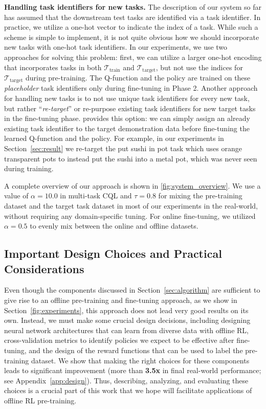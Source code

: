 \textbf{Handling task identifiers for new tasks.} The description of our system so far has assumed that the downstream test tasks are identified via a task identifier. In practice, we utilize a one-hot vector to indicate the index of a task. While such a scheme is simple to implement, it is not quite obvious how we should incorporate new tasks with one-hot task identifiers. In our experiments, we use two approaches for solving this problem: first, we can utilize a larger one-hot encoding that incorporates tasks in both $\mathcal{T}_\text{train}$ and $\mathcal{T}_\text{target}$, but not use the indices for $\mathcal{T}_\text{target}$ during pre-training. The Q-function and the policy are trained on these \emph{placeholder} task identifiers only during fine-tuning in Phase 2. 
Another approach for handling new tasks is to not use unique task identifiers for every new task, but rather ``\emph{re-target}'' or re-purpose existing task identifiers for new target tasks in the fine-tuning phase. \ptrmethodname provides this option: we can simply assign an already existing task identifier to the target demonstration data before fine-tuning the learned Q-function and the policy. For example, in our experiments in Section~\ref{sec:result} we re-target the put sushi in pot task which uses orange transparent pots to instead put the sushi into a metal pot, which was never seen during training.

A complete overview of our approach is shown in \autoref{fig:system_overview}. We use a value of $\alpha=10.0$ in multi-task CQL and $\tau=0.8$ for mixing the pre-training dataset and the target task dataset in most of our experiments in the real-world, without requiring any domain-specific tuning. For online fine-tuning, we utilized $\alpha=0.5$ to evenly mix between the online and offline datasets. 

\vspace{0.07cm}
\subsection{Important Design Choices and Practical Considerations}
\label{sec:design_choices}
\vspace{0.07cm}
Even though the components discussed in Section~\ref{sec:algorithm} are sufficient to give rise to an offline pre-training and fine-tuning approach, as we show in Section~\ref{fig:experiments}, this approach does not lead very good results on its own. Instead, we must make some crucial design decisions, including designing  neural network architectures that can learn from diverse data with offline RL,
cross-validation metrics to identify policies we expect to be effective after fine-tuning, and the design of the reward functions that can be used to label the pre-training dataset. {We show that making the right choices for these components leads to significant improvement (more than \textbf{3.5x} in final real-world performance; see Appendix~\ref{app:design}). Thus, describing, analyzing, and evaluating these choices is a crucial part of this work that we hope will facilitate applications of offline RL pre-training.}


